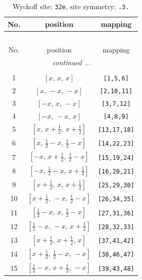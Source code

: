 \documentclass[fleqn,8pt]{jsarticle}
\begin{document}
\begin{longtable}{ccc}
\caption{Wyckoff site: {\tt 32e}, site symmetry: {\tt .3.}}
 \\
 \hline \hline
No. & position & mapping \\ \hline \endfirsthead

\multicolumn{2}{l}{\tablename\ \thetable{}} \\
 \hline \hline
No. & position & mapping \\ \hline \endhead

 \hline \hline
\multicolumn{2}{r}{\footnotesize\it continued ...} \\ \endfoot

 \hline \hline
\multicolumn{2}{r}{} \\ \endlastfoot

1 & $\left[ x,\, x,\, x \right]$ & {\tt [1,5,6]} \\ \hline
2 & $\left[ x,\, - x,\, - x \right]$ & {\tt [2,10,11]} \\ \hline
3 & $\left[ - x,\, x,\, - x \right]$ & {\tt [3,7,12]} \\ \hline
4 & $\left[ - x,\, - x,\, x \right]$ & {\tt [4,8,9]} \\ \hline
5 & $\left[ x,\, x + \frac{1}{2},\, x + \frac{1}{2} \right]$ & {\tt [13,17,18]} \\ \hline
6 & $\left[ x,\, \frac{1}{2} - x,\, \frac{1}{2} - x \right]$ & {\tt [14,22,23]} \\ \hline
7 & $\left[ - x,\, x + \frac{1}{2},\, \frac{1}{2} - x \right]$ & {\tt [15,19,24]} \\ \hline
8 & $\left[ - x,\, \frac{1}{2} - x,\, x + \frac{1}{2} \right]$ & {\tt [16,20,21]} \\ \hline
9 & $\left[ x + \frac{1}{2},\, x,\, x + \frac{1}{2} \right]$ & {\tt [25,29,30]} \\ \hline
10 & $\left[ x + \frac{1}{2},\, - x,\, \frac{1}{2} - x \right]$ & {\tt [26,34,35]} \\ \hline
11 & $\left[ \frac{1}{2} - x,\, x,\, \frac{1}{2} - x \right]$ & {\tt [27,31,36]} \\ \hline
12 & $\left[ \frac{1}{2} - x,\, - x,\, x + \frac{1}{2} \right]$ & {\tt [28,32,33]} \\ \hline
13 & $\left[ x + \frac{1}{2},\, x + \frac{1}{2},\, x \right]$ & {\tt [37,41,42]} \\ \hline
14 & $\left[ x + \frac{1}{2},\, \frac{1}{2} - x,\, - x \right]$ & {\tt [38,46,47]} \\ \hline
15 & $\left[ \frac{1}{2} - x,\, x + \frac{1}{2},\, - x \right]$ & {\tt [39,43,48]} \\ \hline

\end{longtable}
\end{document}
